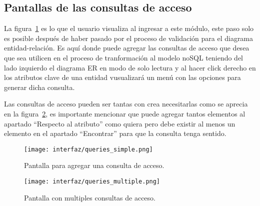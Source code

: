 \subsection*{Pantallas de las consultas de acceso}

La figura~\ref{img:app_simpleQuery} es lo que el usuario visualiza al ingresar a este módulo, este paso solo es posible después de haber pasado por el proceso de validación para el diagrama entidad-relación. Es aquí donde puede agregar las consultas de acceso que desea que sea utilicen en el proceso de tranformación al modelo noSQL teniendo del lado izquierdo el diagrama ER en modo de solo lectura y al hacer click derecho en los atributos clave de una entidad vusualizará un menú con las opciones para generar dicha consulta.

Las consultas de acceso pueden ser tantas con crea necesitarlas como se aprecia en la figura~\ref{img:app_multipleQueries}, es importante mencionar que puede agregar tantos elementos al apartado ``Respecto al atributo'' como quiera pero debe existir al menos un elemento en el apartado ``Encontrar'' para que la consulta tenga sentido.

\begin{figure}[H]
    \centering
    \texttt{[image: interfaz/queries\_simple.png]}
    \caption{Pantalla para agregar una consulta de acceso.}
    \label{img:app_simpleQuery}
\end{figure}

\begin{figure}[H]
    \centering
    \texttt{[image: interfaz/queries\_multiple.png]}
    \caption{Pantalla con multiples consultas de acceso.}
    \label{img:app_multipleQueries}
\end{figure}


